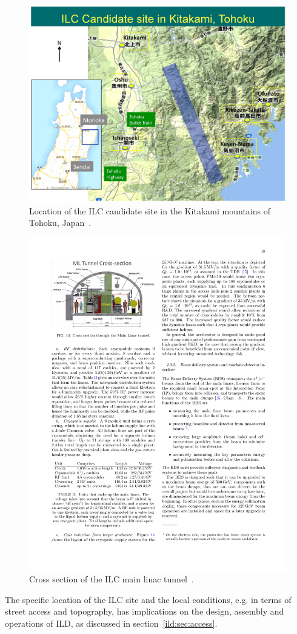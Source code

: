 \begin{figure}[h!]
\centering
\includegraphics[width=0.9\hsize]{ILC/figs/ILC-Candidate-Area.jpg}
\caption{\label{ild:fig:ilc_site}Location of the ILC candidate site in the Kitakami mountains of Tohoku, Japan~\cite{ild:bib:Newsline_Kitakami}.}
\end{figure}
\begin{figure}[h!]
\centering
\includegraphics[width=0.8\hsize]{ILC/figs/ilc_tunnel.pdf}
\caption{\label{ild:fig:ilc_tunnel}Cross section of the ILC main linac tunnel~\cite{Bambade:2019fyw}.}
\end{figure}
The specific location of the ILC site and the local conditions, e.g. in terms of street access and topography, has implications on the design, assembly and operations of ILD, as discussed in section~\ref{ild:sec:access}.

